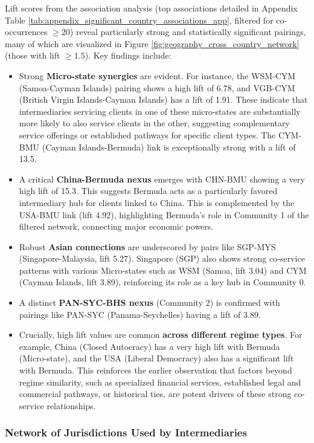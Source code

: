 Lift scores from the association analysis (top associations detailed in Appendix Table \ref{tab:appendix_significant_country_associations_app}, filtered for co-occurrences $\ge 20$) reveal particularly strong and statistically significant pairings, many of which are visualized in Figure \ref{fig:geography_cross_country_network} (those with lift $\ge 1.5$).
Key findings include:
\begin{itemize}
    \item Strong \textbf{Micro-state synergies} are evident. For instance, the WSM-CYM (Samoa-Cayman Islands) pairing shows a high lift of 6.78, and VGB-CYM (British Virgin Islands-Cayman Islands) has a lift of 1.91. These indicate that intermediaries servicing clients in one of these micro-states are substantially more likely to also service clients in the other, suggesting complementary service offerings or established pathways for specific client types. The CYM-BMU (Cayman Islands-Bermuda) link is exceptionally strong with a lift of 13.5.
    \item A critical \textbf{China-Bermuda nexus} emerges with CHN-BMU showing a very high lift of 15.3. This suggests Bermuda acts as a particularly favored intermediary hub for clients linked to China. This is complemented by the USA-BMU link (lift 4.92), highlighting Bermuda's role in Community 1 of the filtered network, connecting major economic powers.
    \item Robust \textbf{Asian connections} are underscored by pairs like SGP-MYS (Singapore-Malaysia, lift 5.27). Singapore (SGP) also shows strong co-service patterns with various Micro-states such as WSM (Samoa, lift 3.04) and CYM (Cayman Islands, lift 3.89), reinforcing its role as a key hub in Community 0.
    \item A distinct \textbf{PAN-SYC-BHS nexus} (Community 2) is confirmed with pairings like PAN-SYC (Panama-Seychelles) having a lift of 3.89.
    \item Crucially, high lift values are common \textbf{across different regime types}. For example, China (Closed Autocracy) has a very high lift with Bermuda (Micro-state), and the USA (Liberal Democracy) also has a significant lift with Bermuda. This reinforces the earlier observation that factors beyond regime similarity, such as specialized financial services, established legal and commercial pathways, or historical ties, are potent drivers of these strong co-service relationships.
\end{itemize}

\subsubsection{Network of Jurisdictions Used by Intermediaries}
\label{subsubsec:network_jurisdictions_used}

